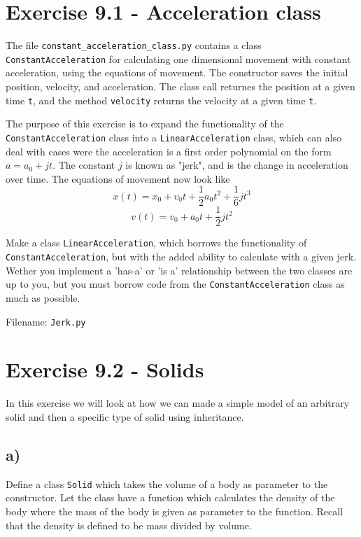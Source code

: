 \documentclass[10pt,a4paper]{article}
\newcommand{\half}{\frac{1}{2}}
\begin{document}
\section*{Exercise 9.1 - Acceleration class}

The file \texttt{constant\_acceleration\_class.py} contains a class \texttt{ConstantAcceleration} for calculating one dimensional movement with constant acceleration, using the equations of movement. The constructor saves the initial position, velocity, and acceleration. The class call returnes the position at a given time \texttt{t}, and the method \texttt{velocity} returns the velocity at a given time \texttt{t}.

The purpose of this exercise is to expand the functionality of the \texttt{ConstantAcceleration} class into a \texttt{LinearAcceleration} class, which can also deal with cases were the acceleration is a first order polynomial on the form $a = a_0 + jt$. The constant $j$ is known as "jerk", and is the change in acceleration over time. The equations of movement now look like
\[	x(t) = x_0 + v_0t + \half a_0t^2 + \frac{1}{6}jt^3
\]
\[	v(t) = v_0 + a_0t + \half jt^2
\]

Make a class \texttt{LinearAcceleration}, which borrows the functionality of \texttt{ConstantAcceleration}, but with the added ability to calculate with a given jerk. Wether you implement a 'has-a' or 'is a' relationship between the two classes are up to you, but you must borrow code from the \texttt{ConstantAcceleration} class as much as possible.

Filename: \texttt{Jerk.py}



\section*{Exercise 9.2 - Solids}
In this exercise we will look at how we can made a simple model of an arbitrary solid and then a specific type of solid using inheritance. 

\subsection*{a)}
Define a class \texttt{Solid} which takes the volume of a body as parameter to the constructor.
Let the class have a function which calculates the density of the body where the mass of the body is given as parameter to the function. Recall that the density is defined to be mass divided by volume. 
\end{document}
